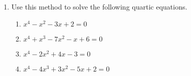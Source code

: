 {\begin{enumerate}
\item
Use this method to solve the following quartic equations.
\begin{multicols}{2}
\begin{enumerate}

\item 
$x^4 - x^2 - 3x + 2 = 0$

\item 
$x^4 +  x^3 - 7 x^2 - x + 6 = 0$

\item 
$x^4 -2 x^2 + 4 x -3 = 0$

\item 
$x^4 - 4 x^3 + 3x^2 - 5x +2 = 0$

\end{enumerate}
\end{multicols} 
 
\end{enumerate}
 
}
 
 
 
 
 
 
